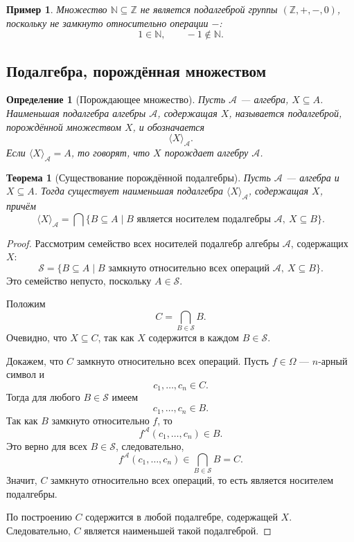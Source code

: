 \documentclass[12pt,a4paper]{article}
\newtheorem{definition}{Определение}
\newtheorem{theorem}{Теорема}
\newtheorem{example}{Пример}
\begin{document}
\begin{example}
Множество $\mathbb N\subseteq \mathbb Z$ не является подалгеброй группы $(\mathbb Z,+,-,0)$, поскольку не замкнуто относительно операции $-$:
\[
1\in\mathbb N,\qquad -1\notin\mathbb N.
\]
\end{example}

\subsection{Подалгебра, порождённая множеством}

\begin{definition}[Порождающее множество]
Пусть $\mathcal A$ --- алгебра, $X\subseteq A$. Наименьшая подалгебра алгебры $\mathcal A$, содержащая $X$, называется \emph{подалгеброй, порождённой множеством $X$}, и обозначается
\[
\langle X\rangle_{\mathcal A}.
\]
Если $\langle X\rangle_{\mathcal A}=A$, то говорят, что $X$ \emph{порождает} алгебру $\mathcal A$.
\end{definition}

\begin{theorem}[Существование порождённой подалгебры]
Пусть $\mathcal A$ --- алгебра и $X\subseteq A$. Тогда существует наименьшая подалгебра $\langle X\rangle_{\mathcal A}$, содержащая $X$, причём
\[
\langle X\rangle_{\mathcal A}
=
\bigcap\{B\subseteq A\mid B \text{ является носителем подалгебры } \mathcal A,\ X\subseteq B\}.
\]
\end{theorem}

\begin{proof}
Рассмотрим семейство всех носителей подалгебр алгебры $\mathcal A$, содержащих $X$:
\[
\mathcal S=\{B\subseteq A\mid B \text{ замкнуто относительно всех операций } \mathcal A,\ X\subseteq B\}.
\]
Это семейство непусто, поскольку $A\in\mathcal S$.

Положим
\[
C=\bigcap_{B\in\mathcal S}B.
\]
Очевидно, что $X\subseteq C$, так как $X$ содержится в каждом $B\in\mathcal S$.

Докажем, что $C$ замкнуто относительно всех операций. Пусть $f\in\Omega$ --- $n$-арный символ и
\[
c_1,\dots,c_n\in C.
\]
Тогда для любого $B\in\mathcal S$ имеем
\[
c_1,\dots,c_n\in B.
\]
Так как $B$ замкнуто относительно $f$, то
\[
f^{\mathcal A}(c_1,\dots,c_n)\in B.
\]
Это верно для всех $B\in\mathcal S$, следовательно,
\[
f^{\mathcal A}(c_1,\dots,c_n)\in \bigcap_{B\in\mathcal S}B=C.
\]
Значит, $C$ замкнуто относительно всех операций, то есть является носителем подалгебры.

По построению $C$ содержится в любой подалгебре, содержащей $X$. Следовательно, $C$ является наименьшей такой подалгеброй.
\end{proof}
\end{document}
